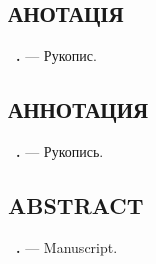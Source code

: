 
\begin{center}
\section*{\MakeUppercase{анотація}}
\end{center}

\textbf{\thesisAuthorFIO~\thesisTitle.} --- Рукопис.

\abstractBegin

\keywords


\begin{center}
{\section*{\MakeUppercase{АННОТАЦИЯ}}}
\end{center}

\textbf{\thesisAuthorFIOru~\thesisTitleRu.} --- Рукопись.

\abstractBeginRu

\keywordsRu


\begin{center}
{\section*{\MakeUppercase{ABSTRACT}}}
\end{center}

\textbf{\thesisAuthorFIOen~\thesisTitleEn.} ---  Manuscript.

\abstractBeginEn

\keywordsEn